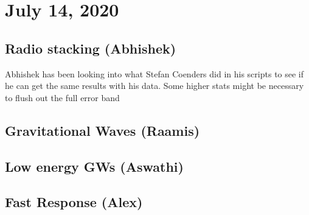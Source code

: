 \chapter{July 14, 2020}
\section{Radio stacking (Abhishek)}
Abhishek has been looking into what Stefan Coenders did in his scripts to see if he can get the same results with his data. Some higher stats might be necessary to flush out the full error band

\section{Gravitational Waves (Raamis)}
 

\section{Low energy GWs (Aswathi)}


\section{Fast Response (Alex)}
